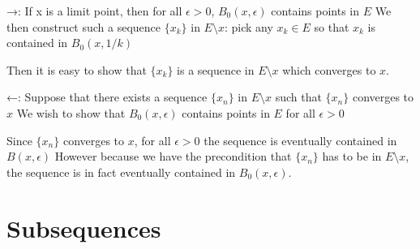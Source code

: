 \begin{enumerate}
→: If x is a limit point, then for all $\epsilon>0$, $B_0(x,\epsilon)$ contains points in $E$
We then construct such a sequence $\{x_k\}$ in $E\setminus x$: pick any $x_k \in E$ so that $x_k$ is contained in $B_0(x,1/k)$

Then it is easy to show that $\{x_k\}$ is a sequence in $E\setminus x$ which converges to $x$.

←: Suppose that there exists a sequence $\{x_n\}$ in $E\setminus x$ such that $\{x_n\}$ converges to $x$
We wish to show that $B_0(x,\epsilon)$ contains points in $E$ for all $\epsilon>0$

Since $\{x_n\}$ converges to $x$, for all $\epsilon>0$ the sequence is eventually contained in $B(x,\epsilon)$
However because we have the precondition that $\{x_n\}$ has to be in $E\setminus x$, the sequence is in fact eventually contained in $B_0(x,\epsilon)$.
\end{enumerate}

\section{Subsequences}


